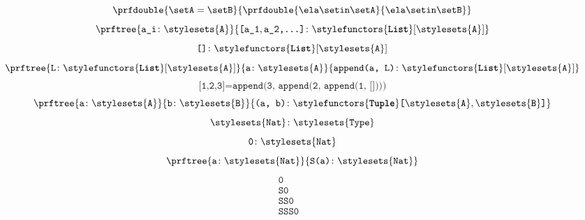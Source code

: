 {\begin{forslides}
\begin{equation}
        \prfdouble{
            \setA =\setB}{\prfdouble{\ela \setin \setA}{\ela\setin \setB}}
    \end{equation}
    \begin{equation}
        \label{eq:typecon_1_session1_22}
        \prftree{\texttt{a\_i}\colon \stylesets{\texttt{A}}}{\texttt{[a\_1},\texttt{a\_2,\ldots]}\colon \stylefunctors{\textbf{\texttt{List}}}[\stylesets{\texttt{A}}]}
    \end{equation}
    \begin{equation}
        \label{eq:typecon_2_session1_22}
        \texttt{[]}\colon \stylefunctors{\textbf{\texttt{List}}}[\stylesets{\texttt{A}}]
    \end{equation}
    \begin{equation}
        \label{eq:typecon_3_session1_22}
        \prftree{\texttt{L}\colon \stylefunctors{\textbf{\texttt{List}}}[\stylesets{\texttt{A}}]}{\texttt{a}\colon \stylesets{\texttt{A}}}{\texttt{append(a, L)}\colon \stylefunctors{\textbf{\texttt{List}}}[\stylesets{\texttt{A}}]}
    \end{equation}
    \begin{equation}
        \label{eq:typecon_4_session1_22}
        \texttt{[1,2,3]} = \texttt{append(3, append(2, append(1, [])))}
    \end{equation}
    \begin{equation}
        \label{eq:typecon_5_session1_22}
        \prftree{\texttt{a}\colon \stylesets{\texttt{A}}}
        {\texttt{b}\colon \stylesets{\texttt{B}}}
        {\texttt{(a, b)}\colon \stylefunctors{\textbf{\texttt{Tuple}}}\texttt{[}\stylesets{\texttt{A}},\stylesets{\texttt{B}}\texttt{]}}
    \end{equation}
    \begin{equation}
        \label{eq:typecon_6_session1_22}
        \stylesets{\texttt{Nat}}\colon \stylesets{\texttt{Type}}
    \end{equation}
    \begin{equation}
        \label{eq:typecon_7_session1_22}
        \texttt{0}\colon \stylesets{\texttt{Nat}}
    \end{equation}
    \begin{equation}
        \label{eq:typecon_8_session1_22}
        \prftree{\texttt{a}\colon \stylesets{\texttt{Nat}}}
        {\texttt{S(a)}\colon \stylesets{\texttt{Nat}}}
    \end{equation}
    \begin{equation}
        \label{eq:typecon_9_session1_22}
        \begin{aligned}
            \texttt{0}    & \\
            \texttt{S0}   & \\
            \texttt{SS0}  & \\
            \texttt{SSS0} &
        \end{aligned}
    \end{equation}


\end{forslides}}
